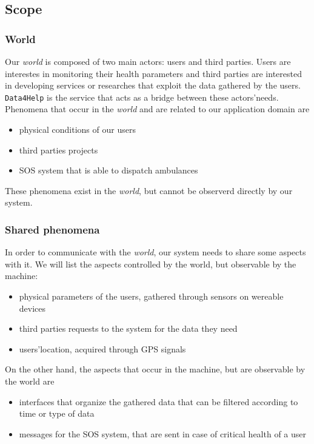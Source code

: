 \documentclass[12pt]{article}
\begin{document}
  \subsection{Scope}

    \subsubsection{World}

      Our \textit{world} is composed of two main actors: users and third parties. Users are interestes in monitoring their health parameters and third parties are interested in developing services or researches that exploit the data gathered by the users. \texttt{Data4Help} is the service that acts as a bridge between these actors'needs. \\
      Phenomena that occur in the \textit{world} and are related to our application domain are
      \begin{itemize}
        \item physical conditions of our users
        \item third parties projects
        \item SOS system that is able to dispatch ambulances
      \end{itemize}
      These phenomena exist in the \textit{world}, but cannot be observerd directly by our system.

    \subsubsection{Shared phenomena}

      In order to communicate with the \textit{world}, our system needs to share some aspects with it. We will list the aspects controlled by the world, but observable by the machine:
      \begin{itemize}
        \item physical parameters of the users, gathered through sensors on wereable devices
        \item third parties requests to the system for the data they need
        \item users'location, acquired through GPS signals
      \end{itemize}
      On the other hand, the aspects that occur in the machine, but are observable by the world are
      \begin{itemize}
        \item interfaces that organize the gathered data that can be filtered according to time or type of data
        \item messages for the SOS system, that are sent in case of critical health of a user
      \end{itemize}
\end{document}
